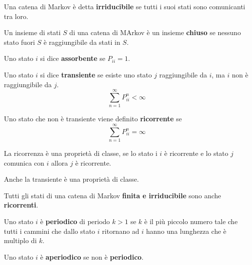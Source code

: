 \begin{definizione}
    Una catena di Markov è detta \textbf{irriducibile} se tutti i suoi stati sono 
    comunicanti tra loro.
\end{definizione}

\begin{definizione}
    Un insieme di stati $S$ di una catena di MArkov è un insieme \textbf{chiuso} 
    se nessuno stato fuori $S$ è raggiungibile da stati in $S$. 
\end{definizione}

\begin{definizione}
    Uno stato $i$ si dice \textbf{assorbente} se $P_{ii} = 1$. 
\end{definizione}

\begin{definizione}
    Uno stato $i$ si dice \textbf{transiente} se esiste uno stato $j$ raggiungibile 
    da $i$, ma $i$ non è raggiungibile da $j$.
    $$\sum_{n=1}^{\infty} P_{ii}^n < \infty$$ 
\end{definizione}

\begin{definizione}
    Uno stato che non è transiente viene definito \textbf{ricorrente} se
    $$\sum_{n=1}^{\infty} P_{ii}^n = \infty$$ 
\end{definizione}

\begin{nota}
    La ricorrenza è una proprietà di classe, se lo stato i $i$ è ricorrente e 
    lo stato $j$ comunica con $i$ allora $j$ è ricorrente.
\end{nota}

\begin{nota}
    Anche la transiente è una proprietà di classe.
\end{nota}


\begin{nota}
    Tutti gli stati di una catena di Markov \textbf{finita e irriducibile} sono 
    anche \textbf{ricorrenti}.
\end{nota}

\begin{definizione}
    Uno stato $i$ è \textbf{periodico} di periodo $k>1$ se $k$ è il più piccolo 
    numero tale che tutti i cammini che dallo stato $i$ ritornano ad $i$ hanno una
    lunghezza che è multiplo di $k$. 
\end{definizione}


\begin{definizione}
    Uno stato $i$ è \textbf{aperiodico} se non è \textbf{periodico}.
\end{definizione}

